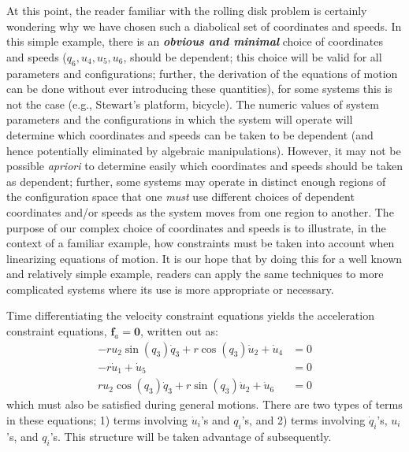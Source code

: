 \documentclass[smallcondensed,final]{svjour3}                     %
\begin{document}
At this point, the reader familiar with the rolling disk problem is certainly
wondering why we have chosen such a diabolical set of coordinates and speeds.
In this simple example, there is an {\bf \textit{obvious and minimal}} choice of
coordinates and speeds ($q_6, u_4, u_5, u_6$, should be dependent; this choice
will be valid for all parameters and configurations; further, the derivation of
the equations of motion can be done without ever introducing these quantities),
for some systems this is not the case (e.g., Stewart's platform, bicycle). The
numeric values of system parameters and the configurations in which the system
will operate will determine which coordinates and speeds can be taken to be
dependent (and hence potentially eliminated by algebraic manipulations).
However, it may not be possible \textit{apriori} to determine easily which
coordinates and speeds should be taken as dependent; further, some systems may
operate in distinct enough regions of the configuration space that one
\textit{must} use different choices of dependent coordinates and/or speeds as
the system moves from one region to another. The purpose of our complex
choice of coordinates and speeds is to illustrate, in the context of a familiar
example, how constraints must be taken into account when linearizing equations
of motion. It is our hope that by doing this for a well known and relatively
simple example, readers can apply the same techniques to more complicated
systems where its use is more appropriate or necessary.

Time differentiating the velocity constraint equations yields the acceleration
constraint equations, $\mathbf{f}_a = \mathbf{0}$, written out as:
\begin{subequations}
\label{rd:f_a}
\begin{align}
    -r u_{2} \sin(q_{3}) \dot{q}_{3} + r \cos(q_{3}) \dot{u}_{2} + \dot{u}_{4} &=
    0\\
    - r \dot{u}_{1} + \dot{u}_{5} &= 0\\
    r u_{2} \cos(q_{3}) \dot{q}_{3} + r \sin(q_{3}) \dot{u}_{2} + \dot{u}_{6} &=
    0
\end{align}
\end{subequations}
which must also be satisfied during general motions. There are two types of
terms in these equations; 1) terms involving $\dot{u}_i$'s and $q_i$'s, and 2)
terms involving $\dot{q}_i$'s, $u_i$'s, and $q_i$'s. This structure will be
taken advantage of subsequently.
\end{document}
